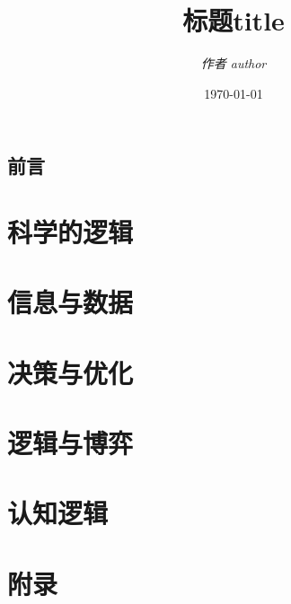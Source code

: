 \documentclass[11pt,a5paper,oneside,fontset=none]{ctexbook}
\title{\bfseries\Huge 标题title}
\author{\itshape\Large 作者 author}
\date{\today}
\begin{document}
\frontmatter
\pagestyle{empty}
\maketitle
\cleardoublepage
\setcounter{page}{1}
\chapter{前言}
\tableofcontents
\mainmatter
\pagestyle{plain}

\part{科学的逻辑}



\part{信息与数据}




\part{决策与优化}




\part{逻辑与博弈}



\part{认知逻辑}



\appendix
\part{附录}




\backmatter


\printindex
\end{document}
